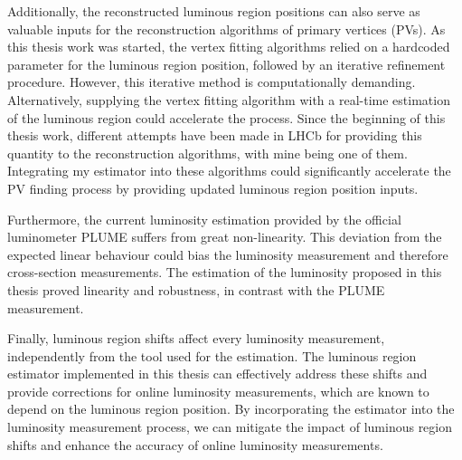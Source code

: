 Additionally, the reconstructed luminous region positions can also serve as valuable inputs for the reconstruction algorithms of primary vertices (PVs). As this thesis work was started, the vertex fitting algorithms relied on a hardcoded parameter for the luminous region position, followed by an iterative refinement procedure. However, this iterative method is computationally demanding. Alternatively, supplying the vertex fitting algorithm with a real-time estimation of the luminous region could accelerate the process. Since the beginning of this thesis work, different attempts have been made in LHCb for providing this quantity to the reconstruction algorithms, with mine being one of them. Integrating my estimator into these algorithms could significantly accelerate the PV finding process by providing updated luminous region position inputs.

Furthermore, the current luminosity estimation provided by the official luminometer PLUME suffers from great non-linearity. This deviation from the expected linear behaviour could bias the luminosity measurement and therefore cross-section measurements. The estimation of the luminosity proposed in this thesis proved linearity and robustness, in contrast with the PLUME measurement.

Finally, luminous region shifts affect every luminosity measurement, independently from the tool used for the estimation. The luminous region estimator implemented in this thesis can effectively address these shifts and provide corrections for online luminosity measurements, which are known to depend on the luminous region position. By incorporating the estimator into the luminosity measurement process, we can mitigate the impact of luminous region shifts and enhance the accuracy of online luminosity measurements.
